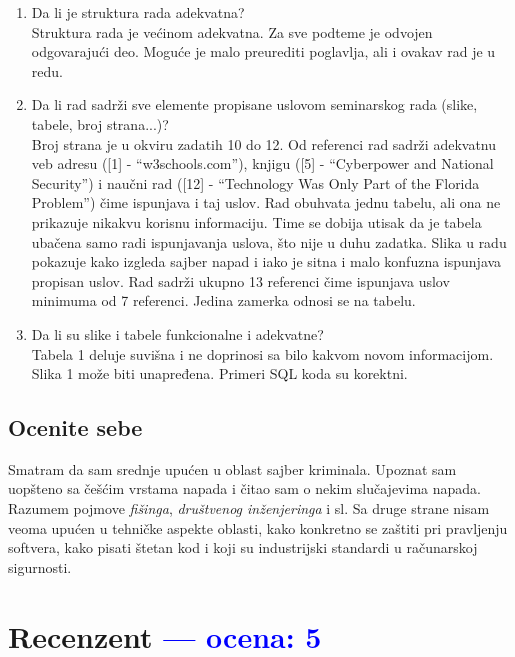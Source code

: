 \documentclass[a4paper]{report}
\newcommand{\odgovor}[1]{\textcolor{blue}{#1}}
\begin{document}
\begin{enumerate}
\item Da li je struktura rada adekvatna?\\
Struktura rada je većinom adekvatna. Za sve podteme je odvojen odgovarajući deo. Moguće je malo preurediti poglavlja, ali i ovakav rad je u redu.

\item Da li rad sadrži sve elemente propisane uslovom seminarskog rada (slike, tabele, broj strana...)?\\
Broj strana je u okviru zadatih 10 do 12. Od referenci rad sadrži adekvatnu veb adresu ([1] - ``w3schools.com''), knjigu ([5] - ``Cyberpower and National Security'') i naučni rad ([12] - ``Technology Was Only Part of the Florida Problem'') čime ispunjava i taj uslov.
Rad obuhvata jednu tabelu, ali ona ne prikazuje nikakvu korisnu informaciju. Time se dobija utisak da je tabela ubačena samo radi ispunjavanja uslova, što nije u duhu zadatka. Slika u radu pokazuje kako izgleda sajber napad i iako je sitna i malo konfuzna ispunjava propisan uslov.
Rad sadrži ukupno 13 referenci čime ispunjava uslov minimuma od 7 referenci. Jedina zamerka odnosi se na tabelu.

\item Da li su slike i tabele funkcionalne i adekvatne?\\
Tabela 1 deluje suvišna i ne doprinosi sa bilo kakvom novom informacijom. Slika 1 može biti unapređena. Primeri SQL koda su korektni.

\end{enumerate}

\section{Ocenite sebe}
Smatram da sam srednje upućen u oblast sajber kriminala. Upoznat sam uopšteno sa češćim vrstama napada i čitao sam o nekim slučajevima napada. Razumem pojmove \textit{fišinga}, \textit{društvenog inženjeringa} i sl. Sa druge strane nisam veoma upućen u tehničke aspekte oblasti, kako konkretno se zaštiti pri pravljenju softvera, kako pisati štetan kod i koji su industrijski standardi u računarskoj sigurnosti.


\chapter{Recenzent \odgovor{--- ocena: 5} }
\end{document}

